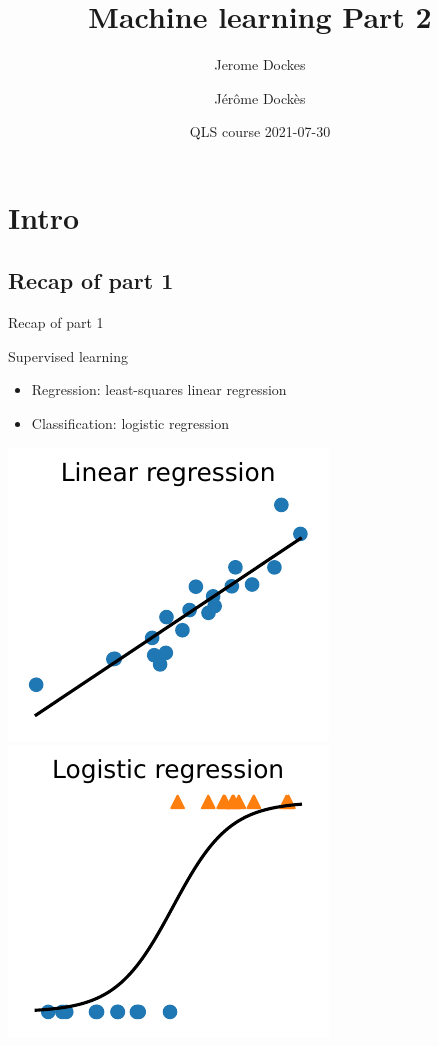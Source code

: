 \documentclass[presentation,mathserif,table]{beamer}
\author{Jerome Dockes}
\date{}
\title{Machine learning Part 2}
\author{Jérôme Dockès}
\date{QLS course 2021-07-30}
\begin{document}
\maketitle
\section{Intro}
\label{sec:org33b303e}
\subsection{Recap of part 1}
\label{sec:org5540b20}
\begin{frame}[label={sec:org0744d39}]{Recap of part 1}
\begin{block}{Supervised learning}
\begin{itemize}
\item Regression: least-squares linear regression
\item Classification: logistic regression
\end{itemize}
\includegraphics[height=.4 \textheight]{figures/generated/linear_regression_1d/linear_regression.pdf}
\includegraphics[height=.4 \textheight]{figures/generated/logistic_regression_1d/logistic_regression.pdf}
\end{block}
\end{frame}
\end{document}
